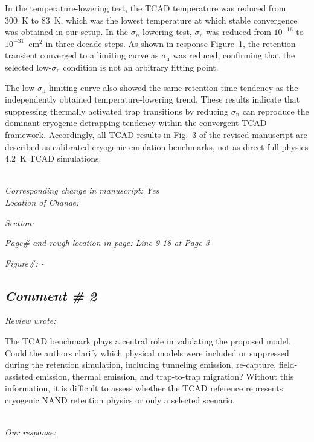 \documentclass[11pt]{article}
\begin{document}
In the temperature-lowering test, the TCAD temperature was reduced from 300~K to 83~K, which was the lowest temperature at which stable convergence was obtained in our setup.
In the $\sigma_n$-lowering test, $\sigma_\mathrm{n}$ was reduced from $10^{-16}$ to $10^{-31}$~cm$^2$ in three-decade steps.
As shown in response Figure~1, the retention transient converged to a limiting curve as $\sigma_\mathrm{n}$ was reduced, confirming that the selected low-$\sigma_\mathrm{n}$ condition is not an arbitrary fitting point.

The low-$\sigma_\mathrm{n}$ limiting curve also showed the same retention-time tendency as the independently obtained temperature-lowering trend.
These results indicate that suppressing thermally activated trap transitions by reducing $\sigma_\mathrm{n}$ can reproduce the dominant cryogenic detrapping tendency within the convergent TCAD framework.
Accordingly, all TCAD results in Fig.~3 of the revised manuscript are described as calibrated cryogenic-emulation benchmarks, not as direct full-physics 4.2~K TCAD simulations.

\noindent \textit{\\Corresponding change in manuscript: Yes \\Location of Change:}

\hspace{40pt} \noindent \textit{Section: \uppercase\expandafter{}}

\hspace{40pt} \noindent \textit{Page\# and rough location in page: Line 9-18 at Page 3}

\hspace{40pt} \noindent \textit{Figure\#: - }

\subsection*{\textit{Comment \# 2}}

\noindent \textit{Review wrote: }

The TCAD benchmark plays a central role in validating the proposed model.
Could the authors clarify which physical models were included or suppressed during the retention simulation, including tunneling emission, re-capture, field-assisted emission, thermal emission, and trap-to-trap migration?
Without this information, it is difficult to assess whether the TCAD reference represents cryogenic NAND retention physics or only a selected scenario.

\noindent \textit{\\Our response: }
\end{document}
